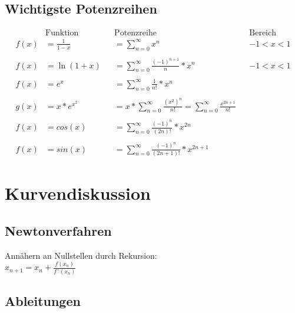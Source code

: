 \documentclass[12pt,a4paper]{article}
\begin{document}
	\subsection{Wichtigste Potenzreihen}
		$$
		\begin{aligned}
		&\text{Funktion }&& \text{Potenzreihe }&& \text{Bereich} \\
		f(x)&= \frac{1}{1-x}&& =\sum^{\infty}_{n=0}x^{n} && -1 <x <1\\\\
		f(x)&= \ln{(1+x)}&&=\sum^{\infty}_{n=0} \frac{(-1)^{n+1}}{n}*x^{n} && -1 <x <1\\\\
		f(x)&=e^{x} &&= \sum^{\infty}_{n=0}{\frac{1}{n!}}*x^{n}\\\\
		g(x)&=x*e^{x^{2}}&&=x*\sum^{\infty}_{n=0} \frac{{(x^{2})^{n}}}{n!} = \sum^{\infty}_{n=0} \frac{x^{2n+1}}{n!}\\\\
		f(x)&=cos(x) &&= \sum^{\infty}_{n=0}{ \frac{(-1)^{n}}{(2n)!}*x^{2n}}\\\\
		f(x)&=sin(x) &&= \sum^{\infty}_{n=0}{ \frac{(-1)^{n}}{(2n+1)!}*x^{2n+1}}
		\end{aligned}
		$$

\section{Kurvendiskussion}
	\subsection{Newtonverfahren}
		Annähern an Nullstellen durch Rekursion:\\
		$x_{n+1} = x_n + \frac{f(x_n)}{f´(x_n)}$
		
	\subsection{Ableitungen}
\end{document}
